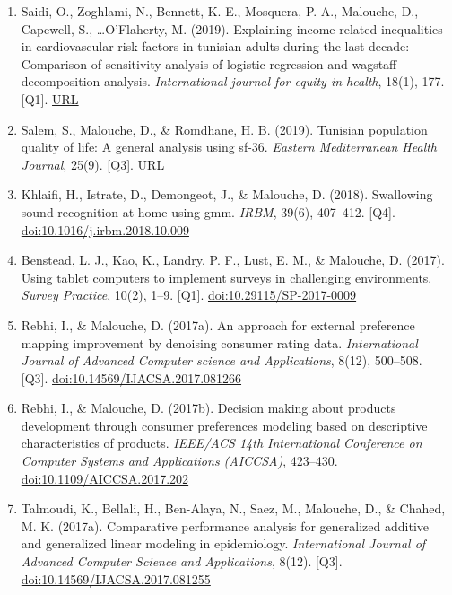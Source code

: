 \documentclass[11pt,a4paper,sans]{moderncv}
\begin{document}
\begin{enumerate}
\item Saidi, O., Zoghlami, N., Bennett, K. E., Mosquera, P. A., Malouche, D., Capewell, S., \ldots O'Flaherty, M. (2019). Explaining income-related inequalities in cardiovascular risk factors in tunisian adults during the last decade: Comparison of sensitivity analysis of logistic regression and wagstaff decomposition analysis. \textit{International journal for equity in health}, 18(1), 177. [Q1]. \href{https://equityhealthj.biomedcentral.com/articles/10.1186/s12939-019-1047-6}{URL}
\item Salem, S., Malouche, D., \& Romdhane, H. B. (2019). Tunisian population quality of life: A general analysis using sf-36. \textit{Eastern Mediterranean Health Journal}, 25(9). [Q3]. \href{https://apps.who.int/iris/bitstream/handle/10665/333459/10203397192509-eng.pdf#page=23}{URL}
\item Khlaifi, H., Istrate, D., Demongeot, J., \& Malouche, D. (2018). Swallowing sound recognition at home using gmm. \textit{IRBM}, 39(6), 407–412. [Q4]. \href{https://doi.org/10.1016/j.irbm.2018.10.009}{doi:10.1016/j.irbm.2018.10.009}
\item Benstead, L. J., Kao, K., Landry, P. F., Lust, E. M., \& Malouche, D. (2017). Using tablet computers to implement surveys in challenging environments. \textit{Survey Practice}, 10(2), 1–9. [Q1]. \href{https://doi.org/10.29115/SP-2017-0009}{doi:10.29115/SP-2017-0009}
\item Rebhi, I., \& Malouche, D. (2017a). An approach for external preference mapping improvement by denoising consumer rating data. \textit{International Journal of Advanced Computer science and Applications}, 8(12), 500–508. [Q3]. \href{https://doi.org/10.14569/IJACSA.2017.081266}{doi:10.14569/IJACSA.2017.081266}
\item Rebhi, I., \& Malouche, D. (2017b). Decision making about products development through consumer preferences modeling based on descriptive characteristics of products. \textit{IEEE/ACS 14th International Conference on Computer Systems and Applications (AICCSA)}, 423–430. \href{https://doi.org/10.1109/AICCSA.2017.202}{doi:10.1109/AICCSA.2017.202}
\item Talmoudi, K., Bellali, H., Ben-Alaya, N., Saez, M., Malouche, D., \& Chahed, M. K. (2017a). Comparative performance analysis for generalized additive and generalized linear modeling in epidemiology. \textit{International Journal of Advanced Computer Science and Applications}, 8(12). [Q3]. \href{https://doi.org/10.14569/IJACSA.2017.081255}{doi:10.14569/IJACSA.2017.081255}

\end{enumerate}
\end{document}
